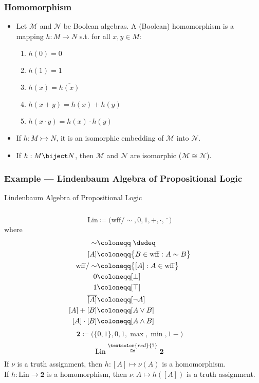 \documentclass[UTF8,11pt,colorlinks,compress,openany]{beamer}%
\begin{document}
\begin{frame}\frametitle{Homomorphism}
	\begin{itemize}
		\item Let $\mathcal{M}$ and $\mathcal{N}$ be Boolean algebras. A (Boolean) homomorphism is a mapping $h: M\to N$ s.t. for all $x,y\in M$:
		\begin{enumerate}
			\item $h(0)=0$
			\item $h(1)=1$
			\item $h(\overline{x})=\overline{h(x)}$
			\item $h(x+y)=h(x)+h(y)$
			\item $h(x\cdot y)=h(x)\cdot h(y)$
		\end{enumerate}
		\item If $h: M\rightarrowtail N$, it is an isomorphic embedding of $\mathcal{M}$ into $\mathcal{N}$.
		\item If $h: M\biject N$, then $\mathcal{M}$ and $\mathcal{N}$ are isomorphic ($\mathcal{M}\cong\mathcal{N}$). 
	\end{itemize}
\end{frame}

\begin{frame}\frametitle{Example --- Lindenbaum Algebra of Propositional Logic}
\setlength\abovedisplayskip{0pt}
\setlength\belowdisplayskip{0pt}
	\begin{block}{Lindenbaum Algebra of Propositional Logic}
	\begin{columns}
		\[\mathrm{Lin}\coloneqq \Big(\mathrm{wff}/\sim,0,1,+,\cdot,\overline{\phantom{x}}\Big)\]
		where 
		\begin{align*}
		\sim&\coloneqq \;\dedeq\\
		[A]&\coloneqq \big\{B\in\mathrm{wff}: A\sim B\big\}\\
		\mathrm{wff}/\sim&\coloneqq \big\{[A]: A\in\mathrm{wff}\big\}\\
		0&\coloneqq [\bot]\\
		1&\coloneqq [\top]\\
		\overline{[A]}&\coloneqq [\neg A]\\
		[A]+[B]&\coloneqq [A\vee B]\\
		[A]\cdot[B]&\coloneqq [A\wedge B]
		\end{align*}
		\[\mathbf{2}\coloneqq \Big(\{0,1\},0,1,\max,\min,1-\Big)\]
		\[\mathrm{Lin}\stackrel{\textcolor{red}{?}}{\cong}\mathbf{2}\]
		If $\nu$ is a truth assignment, then $h: [A]\mapsto\nu(A)$ is a homomorphism.\\
		If $h:\mathrm{Lin}\to\mathbf{2}$ is a homomorphism, then $\nu: A\mapsto h([A])$ is a truth assignment.
	\end{columns}
	\end{block}
\end{frame}
\end{document}
